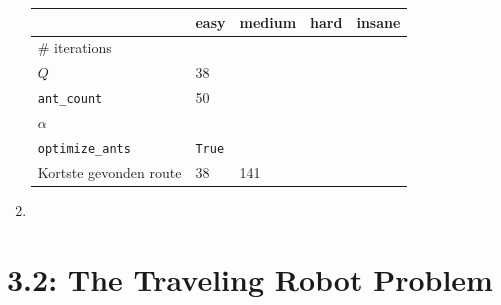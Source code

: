 \documentclass[a4paper,10pt,fleqn]{article}
\begin{document}
\begin{enumerate}[1.]
    \begin{tabular}{l|llll}
                                & easy  & medium    & hard  & insane \\ \hline \hline
        \# iterations           &       &           &       &       \\
        $Q$                     & 38    &           &       &       \\
        \verb|ant_count|        & 50    &           &       &       \\
        $\alpha$                &       &           &       &       \\
        \verb|optimize_ants|    & \verb|True| &     &       &       \\ \hline
        Kortste gevonden route  & 38    & 141       &       &       \\

    \end{tabular}

    \newpage




    \item



\end{enumerate}

\newpage
\section*{3.2: The Traveling Robot Problem}
\end{document}
